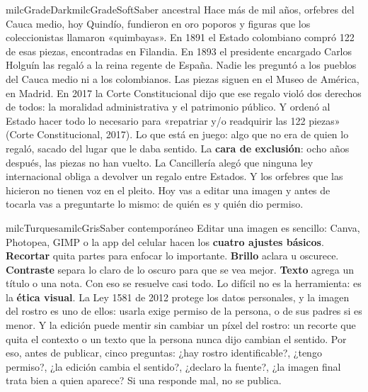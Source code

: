 \documentclass[11pt,letterpaper]{article}
\begin{document}
\begin{softbox}{milcGradeDark}{milcGradeSoft}{Saber ancestral}
Hace más de mil años, orfebres del Cauca medio, hoy Quindío, fundieron en oro poporos y figuras que los coleccionistas llamaron «quimbayas». En 1891 el Estado colombiano compró 122 de esas piezas, encontradas en Filandia. En 1893 el presidente encargado Carlos Holguín las regaló a la reina regente de España. Nadie les preguntó a los pueblos del Cauca medio ni a los colombianos. Las piezas siguen en el Museo de América, en Madrid. En 2017 la Corte Constitucional dijo que ese regalo violó dos derechos de todos: la moralidad administrativa y el patrimonio público. Y ordenó al Estado hacer todo lo necesario para «repatriar y/o readquirir las 122 piezas» (Corte Constitucional, 2017). Lo que está en juego: algo que no era de quien lo regaló, sacado del lugar que le daba sentido. La \textbf{cara de exclusión}: ocho años después, las piezas no han vuelto. La Cancillería alegó que ninguna ley internacional obliga a devolver un regalo entre Estados. Y los orfebres que las hicieron no tienen voz en el pleito. Hoy vas a editar una imagen y antes de tocarla vas a preguntarte lo mismo: de quién es y quién dio permiso.\par{}
\end{softbox}

\begin{softbox}{milcTurquesa}{milcGris}{Saber contemporáneo}
Editar una imagen es sencillo: Canva, Photopea, GIMP o la app del celular hacen los \textbf{cuatro ajustes básicos}. \textbf{Recortar} quita partes para enfocar lo importante. \textbf{Brillo} aclara u oscurece. \textbf{Contraste} separa lo claro de lo oscuro para que se vea mejor. \textbf{Texto} agrega un título o una nota. Con eso se resuelve casi todo. Lo difícil no es la herramienta: es la \textbf{ética visual}. La Ley 1581 de 2012 protege los datos personales, y la imagen del rostro es uno de ellos: usarla exige permiso de la persona, o de sus padres si es menor. Y la edición puede mentir sin cambiar un píxel del rostro: un recorte que quita el contexto o un texto que la persona nunca dijo cambian el sentido. Por eso, antes de publicar, cinco preguntas: ¿hay rostro identificable?, ¿tengo permiso?, ¿la edición cambia el sentido?, ¿declaro la fuente?, ¿la imagen final trata bien a quien aparece? Si una responde mal, no se publica.
\end{softbox}
\end{document}
